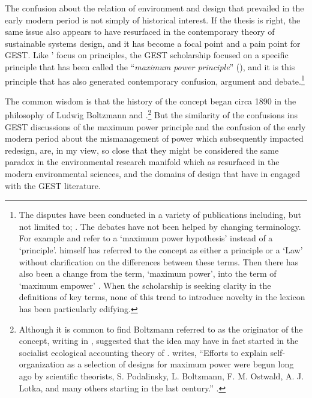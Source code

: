 \documentclass[a4paper, 12pt]{article}
\begin{document}
The confusion about the relation of environment and design that prevailed in the early modern period is not simply of historical interest. If the thesis is right, the same issue also appears to have resurfaced in the contemporary theory of sustainable systems design, and it has become a focal point and a pain point for GEST. Like \citeauthor{descartes_principles_1982}' focus on principles, the GEST scholarship focused on a specific principle that has been called the ``\textit{maximum power principle}'' (\mpp), and it is this principle that has also generated contemporary confusion, argument and debate.\footnote{The disputes have been conducted in a variety of publications including, but not limited to; \citet{cai_maximum_2004, cai_maximum_2006, carteret_maximum_2008, chapman_how_2016, delong_maximum_2008,  dong_progress_2008, dobrynin_can_2019, golley_history_1993, gronlund_holistic_2011, hagen_entangled_1992a, hall_continuing_2004, he_application_2020, keller_philosophy_2000, mansson_ecology_1993-1, odum_maximum_1983, odum_ecological_1994, odum_energy_1995,  patten_toward_1993, salthe_maximum_2010, silvert_theory_1982}. The debates have not been helped by changing terminology. For example \citet{harris_test_2013} and \citet{jorgensen_recent_2016} refer to a `maximum power hypothesis' instead of a `principle'. \citet{odum_material_2002} himself has referred to the concept as either a principle or a `Law' without clarification on the differences between these terms.  Then there has also been a change from the term, `maximum power', into the term of `maximum empower' \citep{giannantoni_mathematics_2006-2,odum_environmental_1995,scienceman_energy_1987, scienceman_emergy_1997, scienceman_sublimation_1999, sundberg_forest_1994-1, ulgiati_emergy_2007}. When the scholarship is seeking clarity in the definitions of key terms, none of this trend to introduce novelty in the lexicon has been particularly edifying.} 

The common wisdom is that the history of the \mpps concept began circa 1890 in the philosophy of Ludwig Boltzmann \citep[p.~25]{srinivasan_hierarchy_2015} and \citeauthor{lotka_elements_1957}.\footnote{Although it is common to find Boltzmann referred to as the originator of the \mpps concept, writing in \citeyear{odum_self-organization_1988}, \citet[p.~1133]{odum_self-organization_1988} suggested that the idea may have in fact started in the socialist ecological accounting theory of \citet{podolinsky_socialism_2004}. \citeauthor{odum_self-organization_1988} writes, ``Efforts to explain self-organization as a selection of designs for maximum power were begun long ago by scientific theorists, S. Podalinsky, L. Boltzmann, F. M. Ostwald, A. J. Lotka, and many others starting in the last century.'' \citep[p.~1133]{odum_self-organization_1988}.} But the similarity of the confusions ins GEST discussions of the maximum power principle and the confusion of the early modern period about the mismanagement of power which subsequently impacted \SEs redesign, are, in my view, so close that they might be considered the same paradox in the environmental research manifold which as resurfaced in the modern environmental sciences, and the domains of design that have in engaged with the GEST literature.
\end{document}
